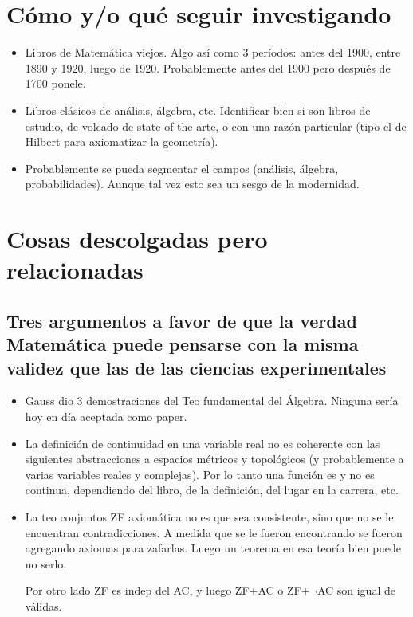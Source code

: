 \documentclass[a4paper,11pt]{article}
\begin{document}
\section{Cómo y/o qué seguir investigando}
\begin{itemize}
	\item Libros de Matemática viejos. Algo así como 3 períodos: antes del 1900, entre 1890 y 1920, luego de 1920. Probablemente antes del 1900 pero después de 1700 ponele.
	\item Libros clásicos de análisis, álgebra, etc. Identificar bien si son libros de estudio, de volcado de state of the arte, o con una razón particular (tipo el de Hilbert para axiomatizar la geometría).
	\item Probablemente se pueda segmentar el campos (análisis, álgebra, probabilidades). Aunque tal vez esto sea un sesgo de la modernidad.
	
\end{itemize}


\section{Cosas descolgadas pero relacionadas}
\subsection{Tres argumentos a favor de que la verdad Matemática puede pensarse con la misma validez que las de las ciencias experimentales}
\begin{itemize}
	\item Gauss dio 3 demostraciones del Teo fundamental del Álgebra. Ninguna sería hoy en día aceptada como paper.
	\item La definición de continuidad en una variable real no es coherente con las siguientes abstracciones a espacios métricos y topológicos (y probablemente a varias variables reales y complejas). Por lo tanto una función es y no es continua, dependiendo del libro, de la definición, del lugar en la carrera, etc.
	\item La teo conjuntos ZF axiomática no es que sea consistente, sino que no se le encuentran contradicciones. A medida que se le fueron encontrando se fueron agregando axiomas para zafarlas. Luego un teorema en esa teoría bien puede no serlo.
	
	Por otro lado ZF es indep del AC, y luego ZF+AC o ZF+$\neg$AC son igual de válidas.
\end{itemize}
\end{document}
